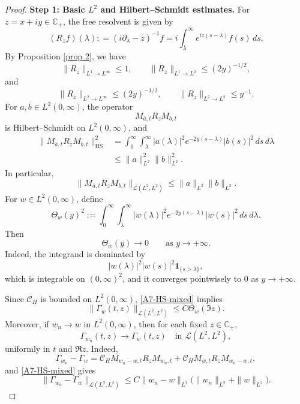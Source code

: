 \documentclass[10pt]{article}
\numberwithin{equation}{section}
\numberwithin{theorem}{section}
\begin{document}
\begin{appendix}
\begin{proof}
\medskip
\noindent
\textbf{Step 1: Basic \(L^2\) and Hilbert--Schmidt estimates.}
For \(z=x+iy\in\mathbb C_+\), the free resolvent is given by
\[
(R_z f)(\lambda) : = (i\partial_\lambda-z)^{-1} f
=
i\int_\lambda^\infty e^{iz(s-\lambda)}f(s)\,ds .
\]
By Proposition \ref{prop 2}, we have
\begin{equation}
\label{A7-Rz-basic-bounds}
\|R_z\|_{L^1\to L^\infty}\le1,
\qquad
\|R_z\|_{L^1\to L^2}\le (2y)^{-1/2},
\end{equation}
and
\begin{equation}
\label{A7-Rz-L2-bounds}
\|R_z\|_{L^2\to L^\infty}\le (2y)^{-1/2},
\qquad
\|R_z\|_{L^2\to L^2}\le y^{-1}.
\end{equation}
For \(a,b\in L^2(0,\infty)\), the operator
\[
M_{\overline a,t}R_zM_{b,t}
\]
is Hilbert--Schmidt on \(L^2(0,\infty)\), and
\begin{equation}
\label{A7-HS-mixed}
\begin{aligned}
\|M_{\overline a,t}R_zM_{b,t}\|_{\mathrm{HS}}^2
&=
\int_0^\infty\int_\lambda^\infty
|a(\lambda)|^2 e^{-2y(s-\lambda)}|b(s)|^2\,ds\,d\lambda  \\
&\le
\|a\|_{L^2}^2\|b\|_{L^2}^2 .
\end{aligned}
\end{equation}
In particular,
\[
\|M_{\overline a,t}R_zM_{b,t}\|_{\mathcal L(L^2,L^2)}
\le
\|a\|_{L^2}\|b\|_{L^2}.
\]
For \(w\in L^2(0,\infty)\), define
\[
\Theta_w(y)^2
:=
\int_0^\infty\int_\lambda^\infty
|w(\lambda)|^2 e^{-2y(s-\lambda)}|w(s)|^2\,ds\,d\lambda .
\]
Then
\[
\Theta_w(y)\to0
\qquad\text{as }y\to+\infty.
\]
Indeed, the integrand is dominated by
\[
|w(\lambda)|^2|w(s)|^2\mathbf 1_{\{s>\lambda\}},
\]
which is integrable on \((0,\infty)^2\), and it converges pointwisely to \(0\) as
\(y\to+\infty\).

Since \(\mathcal C_H\) is bounded on \(L^2(0,\infty)\), \eqref{A7-HS-mixed}
implies
\begin{equation}
\label{A7-Gamma-HS-bound}
\|\Gamma_w(t,z)\|_{\mathcal L(L^2,L^2)}
\le
C\Theta_w(\Im z).
\end{equation}
Moreover, if \(w_n\to w\) in \(L^2(0,\infty)\), then for each fixed
\(z\in\mathbb C_+\),
\begin{equation}
\label{A7-Gamma-L2-continuity}
\Gamma_{w_n}(t,z)\to\Gamma_w(t,z)
\quad\text{in }\mathcal L(L^2,L^2),
\end{equation}
uniformly in \(t\) and \(\Re z\). Indeed,
\[
\Gamma_{w_n}-\Gamma_w
=
\mathcal C_HM_{\overline{w_n-w},t}R_zM_{w_n,t}
+
\mathcal C_HM_{\overline w,t}R_zM_{w_n-w,t},
\]
and \eqref{A7-HS-mixed} gives
\[
\|\Gamma_{w_n}-\Gamma_w\|_{\mathcal L(L^2,L^2)}
\le
C\|w_n-w\|_{L^2}
\bigl(\|w_n\|_{L^2}+\|w\|_{L^2}\bigr).
\]


\end{proof}
\end{appendix}
\end{document}
